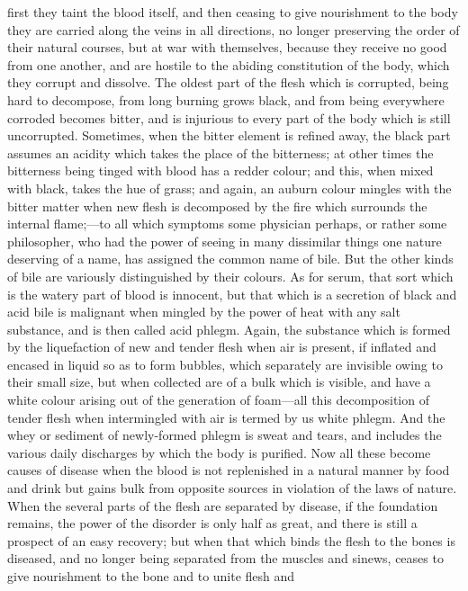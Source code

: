 first they taint the blood itself, and then ceasing to give nourishment to
the body they are carried along the veins in all directions, no longer
preserving the order of their natural courses, but at war with themselves,
because they receive no good from one another, and are hostile to the
abiding constitution of the body, which they corrupt and dissolve. The
oldest part of the flesh which is corrupted, being hard to decompose, from
long burning grows black, and from being everywhere corroded becomes
bitter, and is injurious to every part of the body which is still
uncorrupted. Sometimes, when the bitter element is refined away, the black
part assumes an acidity which takes the place of the bitterness; at other
times the bitterness being tinged with blood has a redder colour; and
this, when mixed with black, takes the hue of grass; and again, an auburn
colour mingles with the bitter matter when new flesh is decomposed by the
fire which surrounds the internal flame;—to all which symptoms some
physician perhaps, or rather some philosopher, who had the power of seeing
in many dissimilar things one nature deserving of a name, has assigned the
common name of bile. But the other kinds of bile are variously
distinguished by their colours. As for serum, that sort which is the
watery part of blood is innocent, but that which is a secretion of black
and acid bile is malignant when mingled by the power of heat with any salt
substance, and is then called acid phlegm. Again, the substance which is
formed by the liquefaction of new and tender flesh when air is present, if
inflated and encased in liquid so as to form bubbles, which separately are
invisible owing to their small size, but when collected are of a bulk
which is visible, and have a white colour arising out of the generation of
foam—all this decomposition of tender flesh when intermingled with
air is termed by us white phlegm. And the whey or sediment of newly-formed
phlegm is sweat and tears, and includes the various daily discharges by
which the body is purified. Now all these become causes of disease when
the blood is not replenished in a natural manner by food and drink but
gains bulk from opposite sources in violation of the laws of nature. When
the several parts of the flesh are separated by disease, if the foundation
remains, the power of the disorder is only half as great, and there is
still a prospect of an easy recovery; but when that which binds the flesh
to the bones is diseased, and no longer being separated from the muscles
and sinews, ceases to give nourishment to the bone and to unite flesh and
